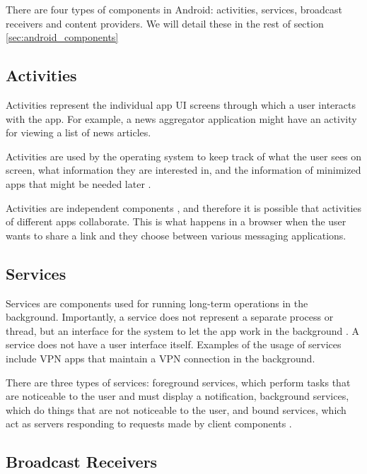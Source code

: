     There are four types of components in Android: activities, services, broadcast receivers and content providers. We will detail these in the rest of section \ref{sec:android_components}
    
    \subsection{Activities}
        \label{subsec:activities}
        
    Activities represent the individual app UI screens through which a user interacts with the app. For example, a news aggregator application might have an activity for viewing a list of news articles.
    
    Activities are used by the operating system to keep track of what the user sees on screen, what information they are interested in, and the information of minimized apps that might be needed later \cite{android_app_fundamentals}.
    
    Activities are independent components \cite{android_app_fundamentals}, and therefore it is possible that activities of different apps collaborate. This is what happens in a browser when the user wants to share a link and they choose between various messaging applications.
    
    \subsection{Services}
        \label{subsec:services}
        
    Services are components used for running long-term operations in the background. Importantly, a service does not represent a separate process or thread, but an interface for the system to let the app work in the background \cite{whats_is_a_service}. A service does not have a user interface itself. Examples of the usage of services include VPN apps that maintain a VPN connection in the background.
    
    There are three types of services: foreground services, which perform tasks that are noticeable to the user and must display a notification, background services, which do things that are not noticeable to the user, and bound services, which act as servers responding to requests made by client components \cite{services_overview}.
    
    \subsection{Broadcast Receivers}
        \label{subsec:receivers}
        
